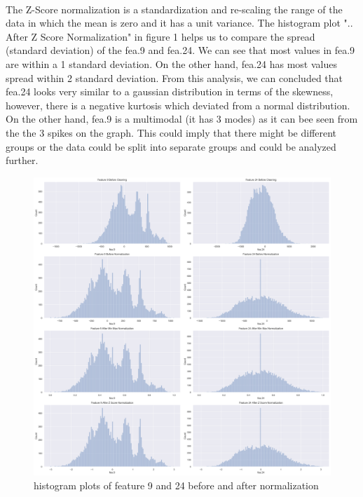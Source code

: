 \\
The Z-Score normalization is a standardization and re-scaling the range of the data in which the mean is zero and it has a unit variance.
The histogram plot ".. After Z Score Normalization" in figure 1 helps us to compare the spread (standard deviation) of the fea.9 and fea.24. We can see that most values in fea.9 are within a 1 standard deviation. On the other hand, fea.24 has most values spread within 2 standard deviation.
From this analysis, we can concluded that fea.24 looks very similar to a gaussian distribution in terms of the skewness, however, there is a negative kurtosis which deviated from a normal distribution. On the other hand, fea.9 is a multimodal (it has 3 modes) as it can bee seen from the the 3 spikes on the graph. This could imply that there might be different groups or the data could be split into separate groups and could be analyzed further. 



%
%

\begin{figure}[!ht]
 \centering
\includegraphics[width=6.1in]{assignment1/1-3-histograms.png}
\caption{\label{fig:fig1}histogram plots of feature 9 and 24 before and after normalization}
\end{figure}
